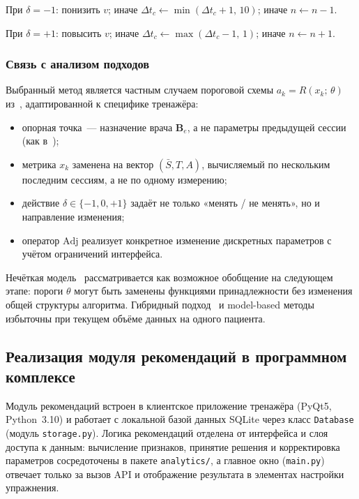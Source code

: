 При $\delta = -1$: понизить $v$; иначе
$\Delta t_c \leftarrow \min(\Delta t_c + 1,\, 10)$; иначе $n \leftarrow n - 1$.

При $\delta = +1$: повысить $v$; иначе
$\Delta t_c \leftarrow \max(\Delta t_c - 1,\, 1)$; иначе $n \leftarrow n + 1$.

\subsubsection{Связь с анализом подходов}

Выбранный метод является частным случаем пороговой схемы
$a_k = R(x_k;\, \theta)$ из~\cite{noble2021,rule10,emg2020}, адаптированной
к специфике тренажёра:
\begin{itemize}
    \item опорная точка~--- назначение врача $\mathbf{B}_e$, а не
    параметры предыдущей сессии (как в~\cite{gomez2021});
    \item метрика $x_k$ заменена на вектор $(\bar{S}, T, A)$, вычисляемый
    по нескольким последним сессиям, а не по одному измерению;
    \item действие $\delta \in \{-1, 0, +1\}$ задаёт не только «менять /
    не менять», но и направление изменения;
    \item оператор $\mathrm{Adj}$ реализует конкретное изменение
    дискретных параметров с учётом ограничений интерфейса.
\end{itemize}

Нечёткая модель~\cite{gomez2021,castro2023} рассматривается как
возможное обобщение на следующем этапе: пороги $\theta$ могут быть
заменены функциями принадлежности без изменения общей структуры
алгоритма. Гибридный подход~\cite{zhou2024} и model-based методы
~\cite{noble2021,mi2020} избыточны при текущем объёме данных на
одного пациента.

\subsection{Реализация модуля рекомендаций в программном комплексе}

Модуль рекомендаций встроен в клиентское приложение тренажёра
(PyQt5, Python~3.10) и работает с локальной базой данных SQLite через класс
\texttt{Database} (модуль \texttt{storage.py}).
Логика рекомендаций отделена от интерфейса и слоя доступа к данным:
вычисление признаков, принятие решения и корректировка параметров
сосредоточены в пакете \texttt{analytics/}, а главное окно
(\texttt{main.py}) отвечает только за вызов API и отображение
результата в элементах настройки упражнения.

